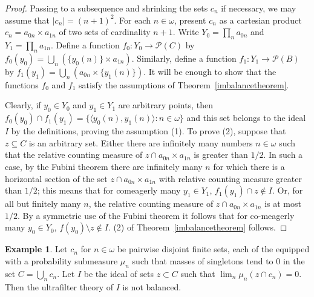 \documentclass{article}
\newcommand{\gw}{\omega}
\newcommand{\power}{\mathcal{P}}
\theoremstyle{definition}
\newtheorem{example}[theorem]{Example}
\begin{document}
\begin{proof}
Passing to a subsequence and shrinking the sets $c_n$ if necessary, we may assume that $|c_n|=(n+1)^2$. For each $n\in\gw$, present $c_n$ as a cartesian product $c_n=a_{0n}\times a_{1n}$ of two sets of cardinality $n+1$. Write $Y_0=\prod_na_{0n}$ and $Y_1=\prod_na_{1n}$. Define a function $f_0\colon Y_0\to\power(C)$ by $f_0(y_0)=\bigcup_n (\{y_0(n)\}\times a_{1n})$. Similarly, define a function $f_1\colon Y_1\to\power(B)$ by $f_1(y_1)=\bigcup_n (a_{0n}\times\{y_1(n)\})$. It will be enough to show that the functions $f_0$ and $f_1$ satisfy the assumptions of Theorem~\ref{imbalancetheorem}.

Clearly, if $y_0\in Y_0$ and $y_1\in Y_1$ are arbitrary points, then $f_0(y_0)\cap f_1(y_1)=\{\langle y_0(n), y_1(n)\rangle\colon n\in\gw\}$ and this set belongs to the ideal $I$ by the definitions, proving the assumption (1). To prove (2), suppose that $z\subseteq C$ is an arbitrary set. Either there are infinitely many numbers $n\in\gw$ such that the relative counting measure of $z\cap a_{0n}\times a_{1n}$ is greater than $1/2$. In such a case, by the Fubini theorem there are infinitely many $n$ for which there is a horizontal section of the set $z\cap a_{0n}\times a_{1n}$ with relative counting measure greater than $1/2$; this means that for comeagerly many $y_1\in Y_1$, $f_1(y_1)\cap z\notin I$. Or, for all but finitely many $n$, the relative counting measure of $z\cap a_{0n}\times a_{1n}$ is at most $1/2$. By a symmetric use of the Fubini theorem it follows that for co-meagerly many $y_0\in Y_0$, $f(y_0)\setminus z\notin I$. (2) of Theorem~\ref{imbalancetheorem} follows.
\end{proof}

\begin{example}
Let $c_n$ for $n\in\gw$ be pairwise disjoint finite sets, each of the equipped with a probability submeasure $\mu_n$ such that masses of singletons tend to $0$ in the set $C=\bigcup_nc_n$. Let $I$ be the ideal of sets $z\subset C$ such that $\lim_n\mu_n(z\cap c_n)=0$. Then the ultrafilter theory of $I$ is not balanced.
\end{example}
\end{document}
